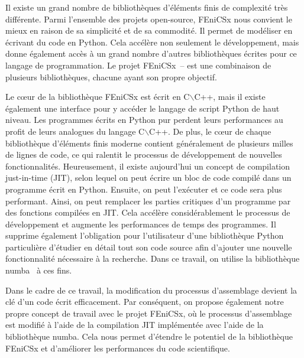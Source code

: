 \documentclass[12pt]{article}
\begin{document}
Il existe un grand nombre de bibliothèques d'éléments finis de complexité très différente. Parmi l'ensemble des projets open-source, FEniCSx nous convient le mieux en raison de sa simplicité et de sa commodité. Il permet de modéliser en écrivant du code en Python. Cela accélère non seulement le développement, mais donne également accès à un grand nombre d'autres bibliothèques écrites pour ce langage de programmation. Le projet FEniCSx~\parencite{FEniCS2015}--\parencite{LoggEtal2012} est une combinaison de plusieurs bibliothèques, chacune ayant son propre objectif. 


Le cœur de la bibliothèque FEniCSx est écrit en C$\backslash$C++, mais il existe également une interface pour y accéder le langage de script Python de haut niveau. Les programmes écrits en Python pur perdent leurs performances au profit de leurs analogues du langage C$\backslash$C++. De plus, le cœur de chaque bibliothèque d'éléments finis moderne contient généralement de plusieurs milles de lignes de code, ce qui ralentit le processus de développement de nouvelles fonctionnalités. Heureusement, il existe aujourd'hui un concept de compilation just-in-time (JIT), selon lequel on peut écrire un bloc de code compilé dans un programme écrit en Python. Ensuite, on peut l'exécuter et ce code sera plus performant. Ainsi, on peut remplacer les parties critiques d'un programme par des fonctions compilées en JIT. Cela accélère considérablement le processus de développement et augmente les performances de temps des programmes. Il supprime également l'obligation pour l'utilisateur d'une bibliothèque Python particulière d'étudier en détail tout son code source afin d'ajouter une nouvelle fonctionnalité nécessaire à la recherche. Dans ce travail, on utilise la bibliothèque numba~\parencite{Numba2015} à ces fins. 

Dans le cadre de ce travail, la modification du processus d'assemblage devient la clé d'un code écrit efficacement. Par conséquent, on propose également notre propre concept de travail avec le projet FEniCSx, où le processus d'assemblage est modifié à l'aide de la compilation JIT implémentée avec l'aide de la bibliothèque numba. Cela nous permet d'étendre le potentiel de la bibliothèque FEniCSx et d'améliorer les performances du code scientifique.
\end{document}

